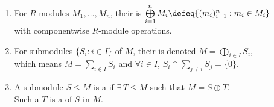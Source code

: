 \begin{definition} \label{def:module-direct-sums} 
\begin{enumerate}[label=(\roman*)]
\setlength{\itemsep}{0pt}
\item For $R$-modules $M_1,\ldots,M_n$, their  is $\bigoplus\limits_{i=1}^{n}M_i\defeq\{(m_i)_{i=1}^{n}:m_i\in M_i\}$\\
with componentwise $R$-module operations.
\item For submodules $\{S_i:i\in I\}$ of $M$, their  is denoted $M=\bigoplus_{i\in I}S_i$,\\
which means $M=\sum\limits_{i\in I}S_i$ and $\forall i\in I$, $S_i\cap\sum_{j\neq i}S_j=\{0\}$.
\item A submodule $S\leq M$ is a  if $\exists\,T\leq M$ such that $M=S\oplus T$.\\
Such a $T$ is a  of $S$ in $M$.
\end{enumerate}
\end{definition}

